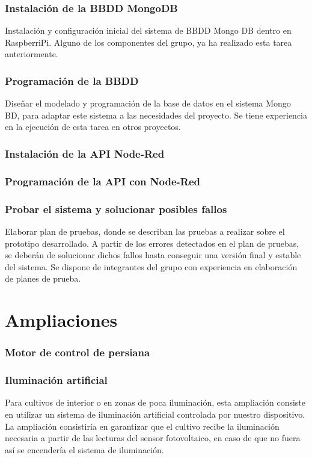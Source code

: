 \documentclass[12pt,a4paper,titlepage,oneside]{report}
\begin{document}
	\subsection*{Instalación de la BBDD MongoDB}
	Instalación y configuración inicial del sistema de BBDD Mongo DB dentro en RaspberriPi. Alguno de los componentes del grupo, ya ha realizado esta tarea anteriormente.
	
	\subsection*{Programación de la BBDD}
	Diseñar el modelado y programación de la base de datos en el sistema Mongo BD, para adaptar este sistema a las necesidades del proyecto. Se tiene experiencia en la ejecución de esta tarea en otros proyectos.
	
	\subsection*{Instalación de la API Node-Red}
	
	\subsection*{Programación de la API con Node-Red}
	
	\subsection*{Probar el sistema y solucionar posibles fallos}
	Elaborar plan de pruebas, donde se describan las pruebas a realizar sobre el prototipo desarrollado. A partir de los errores detectados en el plan de pruebas, se deberán de solucionar dichos fallos hasta conseguir una versión final y estable del sistema.
Se dispone de integrantes del grupo con experiencia en elaboración de planes de prueba.

	

\chapter{Ampliaciones}

	\subsection*{Motor de control de persiana}
	\subsection*{Iluminación artificial}
	Para cultivos de interior o en zonas de poca iluminación, esta ampliación consiste en utilizar un sistema de iluminación artificial controlada por nuestro dispositivo. La ampliación consistiría en garantizar que el cultivo recibe la iluminación necesaria a partir de las lecturas del sensor fotovoltaico, en caso de que no fuera así se encendería el sistema de iluminación.
\end{document}
